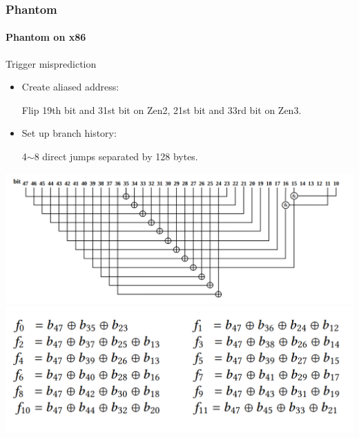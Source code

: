 \documentclass{beamer}
\begin{document}
\begin{frame}
    \frametitle{Phantom}
    \framesubtitle{Phantom on x86}
    \begin{minipage}{0.5\textwidth}
        
        Trigger misprediction
            \begin{itemize}
                \item Create aliased address:
                    
                    Flip 19th bit and 31st bit on Zen2, 21st bit and 33rd bit on Zen3.
                \item Set up branch history:
                    
                    4$\sim$8 direct jumps separated by 128 bytes.
            \end{itemize}
        
    \end{minipage}
    \hfill
    \begin{minipage}{0.4\textwidth}
        \begin{center}
            \includegraphics[width=\textwidth]{Figure/Zen2 tag.png}
            \includegraphics[width=\textwidth]{Figure/Zen3 tag.png}
        \end{center}
    \end{minipage}
\end{frame}
\end{document}
